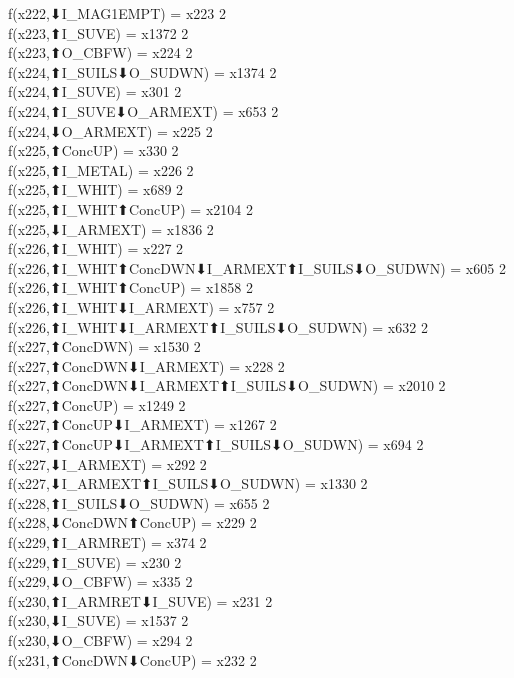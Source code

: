 f(x222,⬇I_MAG1EMPT) = x223 {2} \\
f(x223,⬆I_SUVE) = x1372 {2} \\
f(x223,⬆O_CBFW) = x224 {2} \\
f(x224,⬆I_SUILS⬇O_SUDWN) = x1374 {2} \\
f(x224,⬆I_SUVE) = x301 {2} \\
f(x224,⬆I_SUVE⬇O_ARMEXT) = x653 {2} \\
f(x224,⬇O_ARMEXT) = x225 {2} \\
f(x225,⬆ConcUP) = x330 {2} \\
f(x225,⬆I_METAL) = x226 {2} \\
f(x225,⬆I_WHIT) = x689 {2} \\
f(x225,⬆I_WHIT⬆ConcUP) = x2104 {2} \\
f(x225,⬇I_ARMEXT) = x1836 {2} \\
f(x226,⬆I_WHIT) = x227 {2} \\
f(x226,⬆I_WHIT⬆ConcDWN⬇I_ARMEXT⬆I_SUILS⬇O_SUDWN) = x605 {2} \\
f(x226,⬆I_WHIT⬆ConcUP) = x1858 {2} \\
f(x226,⬆I_WHIT⬇I_ARMEXT) = x757 {2} \\
f(x226,⬆I_WHIT⬇I_ARMEXT⬆I_SUILS⬇O_SUDWN) = x632 {2} \\
f(x227,⬆ConcDWN) = x1530 {2} \\
f(x227,⬆ConcDWN⬇I_ARMEXT) = x228 {2} \\
f(x227,⬆ConcDWN⬇I_ARMEXT⬆I_SUILS⬇O_SUDWN) = x2010 {2} \\
f(x227,⬆ConcUP) = x1249 {2} \\
f(x227,⬆ConcUP⬇I_ARMEXT) = x1267 {2} \\
f(x227,⬆ConcUP⬇I_ARMEXT⬆I_SUILS⬇O_SUDWN) = x694 {2} \\
f(x227,⬇I_ARMEXT) = x292 {2} \\
f(x227,⬇I_ARMEXT⬆I_SUILS⬇O_SUDWN) = x1330 {2} \\
f(x228,⬆I_SUILS⬇O_SUDWN) = x655 {2} \\
f(x228,⬇ConcDWN⬆ConcUP) = x229 {2} \\
f(x229,⬆I_ARMRET) = x374 {2} \\
f(x229,⬆I_SUVE) = x230 {2} \\
f(x229,⬇O_CBFW) = x335 {2} \\
f(x230,⬆I_ARMRET⬇I_SUVE) = x231 {2} \\
f(x230,⬇I_SUVE) = x1537 {2} \\
f(x230,⬇O_CBFW) = x294 {2} \\
f(x231,⬆ConcDWN⬇ConcUP) = x232 {2} \\
